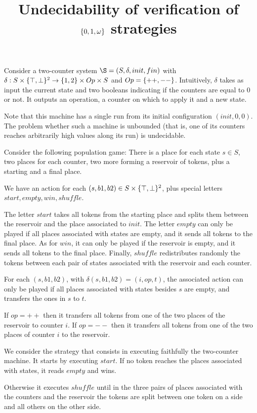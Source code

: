 \documentclass{article}
\title{Undecidability of verification of $\{ 0,1, \omega \}$ strategies}
\author{}
\date{}
\begin{document}
	
	\maketitle

Consider a two-counter system $\S = (S, \delta, init, fin)$ with $\delta : S \times \{ \top, \bot \}^2 \to \{ 1,2 \} \times Op \times S$ and $Op = \{ ++, -- \}$.
Intuitively, $\delta$ takes as input the current state and two booleans indicating if the counters are equal to $0$ or not. It outputs an operation, a counter on which to apply it and a new state.

Note that this machine has a single run from its initial configuration $(init, 0, 0)$.
The problem whether such a machine is unbounded (that is, one of its counters reaches arbitrarily high values along its run) is undecidable.

Consider the following population game: There is a place for each state $s \in S$, two places for each counter, two more forming a reservoir of tokens, plus a starting and a final place.

We have an action for each $(s, b1, b2) \in S \times \{ \top, \bot \}^2$, plus special letters $start, empty, win, shuffle$.

The letter $start$ takes all tokens from the starting place and splits them between the reservoir and the place associated to $init$.
The letter $empty$ can only be played if all places associated with states are empty, and it sends all tokens to the final place.
As for $win$, it can only be played if the reservoir is empty, and it sends all tokens to the final place.
Finally, $shuffle$ redistributes randomly the tokens between each pair of states associated with the reservoir and each counter.

For each $(s, b1, b2)$, with $\delta(s, b1, b2) = (i, op, t)$, the associated action can only be played if all places associated with states besides $s$ are empty, and transfers the ones in $s$ to $t$.

If $op = ++$ then it transfers all tokens from one of the two places of the reservoir to counter $i$.
If $op = --$ then it transfers all tokens from one of the two places of counter $i$ to the reservoir.

We consider the strategy that consists in executing faithfully the two-counter machine. It starts by executing $start$. If no token reaches the places associated with states, it reads $empty$ and wins.

Otherwise it executes $shuffle$ until in the three pairs of places associated with the counters and the reservoir the tokens are split between one token on a side and all others on the other side.
\end{document}
